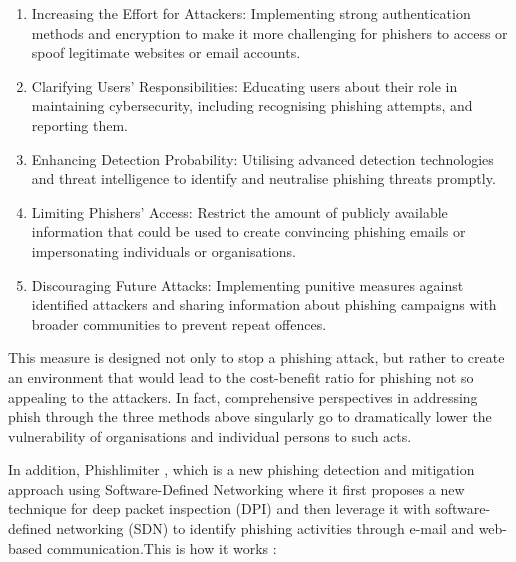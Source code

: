 \begin{enumerate}
    \item Increasing the Effort for Attackers: Implementing strong authentication methods and encryption to make it more challenging for phishers to access or spoof legitimate websites or email accounts.
    \item Clarifying Users' Responsibilities: Educating users about their role in maintaining cybersecurity, including recognising phishing attempts, and reporting them.
    \item Enhancing Detection Probability: Utilising advanced detection technologies and threat intelligence to identify and neutralise phishing threats promptly.
    \item Limiting Phishers' Access: Restrict the amount of publicly available information that could be used to create convincing phishing emails or impersonating individuals or organisations.
    \item Discouraging Future Attacks: Implementing punitive measures against identified attackers and sharing information about phishing campaigns with broader communities to prevent repeat offences.
\end{enumerate}

This measure is designed not only to stop a phishing attack, but rather to create an environment that would lead to the cost-benefit ratio for phishing not so appealing to the attackers. In fact, comprehensive perspectives in addressing phish through the three methods above singularly go to dramatically lower the vulnerability of organisations and individual persons to such acts.

In addition, Phishlimiter \cite{Chin2018PhishLimiter} , which is a new phishing detection and mitigation approach using Software-Defined Networking where it first proposes a new technique for deep packet inspection (DPI) and then leverage it with software-defined networking (SDN) to identify phishing activities through e-mail and web-based communication.This is how it works :


